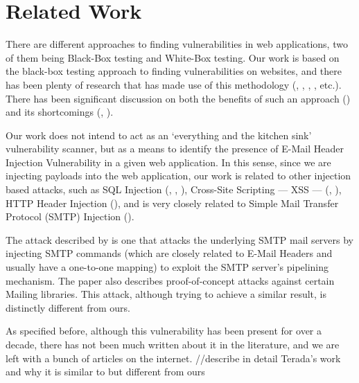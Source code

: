 \chapter{Related Work}

There are different approaches to finding vulnerabilities in web applications, two of them being Black-Box testing and White-Box testing.
Our work is based on the black-box testing approach to finding vulnerabilities on websites, and there has been plenty of research that has made use of this methodology (\cite{Beizer:1995:BTT:202699}, \cite{Huang}, \cite{zanero2005automatic}, \cite{kals2006secubat}, \cite{payet13:ears-in-the-wild} etc.). There has been significant discussion on both the benefits of such an approach (\cite{black-box}) and its shortcomings (\cite{Doupe2010}, \cite{Doupe2012}).

Our work does not intend to act as an `everything and the kitchen sink' vulnerability scanner, but as a means to identify the presence of E-Mail Header Injection Vulnerability in a given web application. In this sense, since we are injecting payloads into the web application, our work is related to other injection based attacks, such as SQL Injection (\cite{sql0}, \cite{sql1}, \cite{sql2}), Cross-Site Scripting --- XSS --- (\cite{Injection1}, \cite{KleinAmit}), HTTP Header Injection (\cite{sessionride}), and is very closely related to Simple Mail Transfer Protocol (SMTP) Injection (\cite{Terada2015}).

The attack described by \cite{Terada2015} is one that attacks the underlying SMTP mail servers by injecting SMTP commands (which are closely related to E-Mail Headers and usually have a one-to-one mapping) to exploit the SMTP server's pipelining mechanism. The paper also describes proof-of-concept attacks against certain Mailing libraries. This attack, although trying to achieve a similar result, is distinctly different from ours. 

As specified before, although this vulnerability has been present for over a decade, there has not been much written about it in the literature, and we are left with a bunch of articles on the internet.
//describe in detail Terada's work and why it is similar to but different from ours